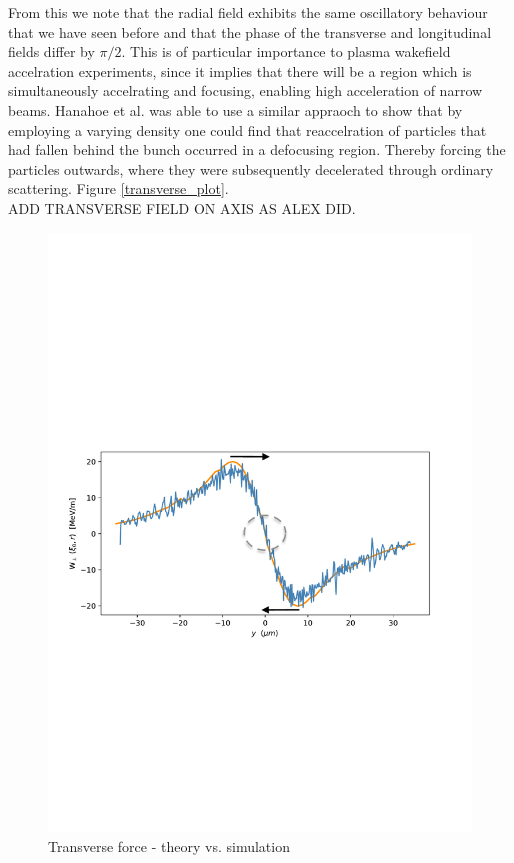From this we note that the radial field exhibits the same oscillatory behaviour that we have seen before and that the phase of the transverse and longitudinal fields differ by $\pi/2$. This is of particular importance to plasma wakefield accelration experiments, since it implies that there will be a region which is simultaneously accelrating and focusing, enabling high acceleration of narrow beams. Hanahoe et al. was able to use a similar appraoch to show that by employing a varying density one could find that reaccelration of particles that had fallen behind the bunch occurred in a defocusing region. Thereby forcing the particles outwards, where they were subsequently decelerated through ordinary scattering. Figure \ref{transverse_plot}.\\
ADD TRANSVERSE FIELD ON AXIS AS ALEX DID. 
\begin{figure}
\centering
\includegraphics[width=\textwidth]{transverse_theory_vs_sim4.pdf}
\caption{Transverse force - theory vs. simulation}
\end{figure}

